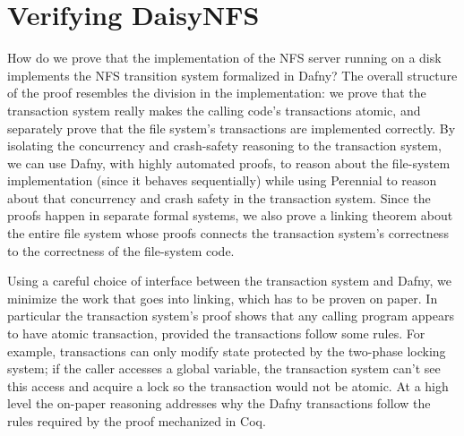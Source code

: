 \section{Verifying DaisyNFS}
\label{sec:proof}

How do we prove that the implementation of the NFS server running on a disk
implements the NFS transition system formalized in Dafny? The overall structure
of the proof resembles the division in the implementation: we prove that the
transaction system really makes the calling code's transactions atomic, and
separately prove that the file system's transactions are implemented correctly.
By isolating the concurrency and crash-safety reasoning to the transaction system, we can use
Dafny, with highly automated proofs, to reason about the file-system
implementation (since it behaves sequentially) while using Perennial to reason
about that concurrency and crash safety in the transaction system. Since the
proofs happen in separate formal systems, we also prove a linking theorem about
the entire file system whose proofs connects the transaction system's
correctness to the correctness of the file-system code.

Using a careful choice of interface between the transaction system and Dafny, we
minimize the work that goes into linking, which has to be proven on paper.
In particular the transaction system's proof
shows that any calling program appears to have atomic transaction, provided the
transactions follow some rules. For example, transactions can only modify state
protected by the two-phase locking system; if the caller accesses a global
variable, the transaction system can't see this access and acquire a lock so the
transaction would not be atomic. At a high level the on-paper reasoning
addresses why the Dafny transactions follow the rules required by the proof
mechanized in Coq.



